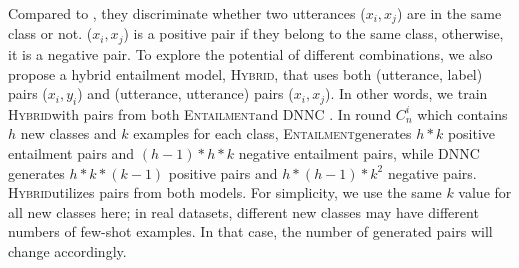 \documentclass[11pt]{article}
\newcommand{\modelname}{\textsc{Entailment}}
\newcommand{\hybrid}{\textsc{Hybrid}}
\begin{document}
Compared to \citet{zhangdiscriminative}, they discriminate whether two utterances ($x_i, x_j$) are in the same class or not.
($x_i, x_j$) is a positive pair if they belong to the same class, otherwise, it is a negative pair. To explore the potential of different combinations, we also propose a hybrid entailment model, \hybrid, that uses both (utterance, label) pairs ($x_i, y_i$) and (utterance, utterance) pairs ($x_i, x_j$). In other words, we train \hybrid\enspace with pairs from both \modelname\enspace and DNNC \cite{zhangdiscriminative}. In round $C_n^i$ which contains $h$ new classes and $k$ examples for each class, \modelname\enspace generates $h*k$ positive entailment pairs and $(h-1)*h*k$ negative entailment pairs, while DNNC generates $h*k*(k-1)$ positive pairs and $h*(h-1)*k^2$ negative pairs. \hybrid\enspace utilizes pairs from both models. For simplicity, we use the same $k$ value for all new classes here; in real datasets, different new classes may have different numbers of few-shot examples. In that case, the number of generated pairs will change accordingly.






\end{document}

